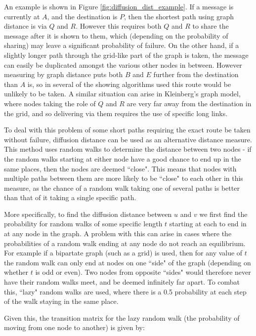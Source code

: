 \documentclass[bsc,frontabs,twoside,singlespacing,parskip,deptreport]{infthesis}     %
\begin{document}
An example is shown in Figure \ref{fig:diffusion_dist_example}. If a message is currently at $A$, and the destination is $P$, then the shortest path using graph distance is via $Q$ and $R$. However this requires both $Q$ and $R$ to share the message after it is shown to them, which (depending on the probability of sharing) may leave a significant probability of failure. On the other hand, if a slightly longer path through the grid-like part of the graph is taken, the message can easily be duplicated amongst the various other nodes in between. However measuring by graph distance puts both $B$ and $E$ further from the destination than $A$ is, so in several of the showing algorithms used this route would be unlikely to be taken. A similar situation can arise in Kleinberg's graph model, where nodes taking the role of $Q$ and $R$ are very far away from the destination in the grid, and so delivering via them requires the use of specific long links.

To deal with this problem of some short paths requiring the exact route be taken without failure, diffusion distance can be used as an alternative distance measure. This method uses random walks to determine the distance between two nodes - if the random walks starting at either node have a good chance to end up in the same places, then the nodes are deemed ``close". This means that nodes with multiple paths between them are more likely to be ``close" to each other in this measure, as the chance of a random walk taking one of several paths is better than that of it taking a single specific path.

More specifically, to find the diffusion distance between $u$ and $v$ we first find the probability for random walks of some specific length $t$ starting at each to end in at any node in the graph. A problem with this can arise in cases where the probabilities of a random walk ending at any node do not reach an equilibrium. For example if a bipartate graph (such as a grid) is used, then for any value of $t$ the random walk can only end at nodes on one ``side" of the graph (depending on whether $t$ is odd or even). Two nodes from opposite ``sides" would therefore never have their random walks meet, and be deemed infinitely far apart. To combat this, ``lazy" random walks are used, where there is a 0.5 probability at each step of the walk staying in the same place.

Given this, the transition matrix for the lazy random walk (the probability of moving from one node to another) is given by:
\end{document}
